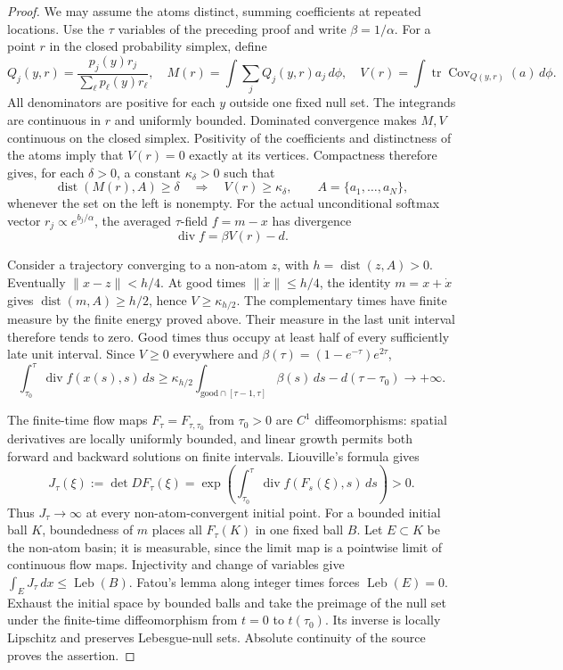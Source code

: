 \documentclass[11pt]{article}
\newcommand{\Cov}{\operatorname{Cov}}
\newcommand{\dist}{\operatorname{dist}}
\begin{document}
\begin{proof}
We may assume the atoms distinct, summing coefficients at repeated locations.
Use the $\tau$ variables of the preceding proof and write $\beta=1/\alpha$.
For a point $r$ in the closed probability simplex, define
\[
Q_j(y,r)=\frac{p_j(y)r_j}{\sum_\ell p_\ell(y)r_\ell},\quad
M(r)=\int\sum_jQ_j(y,r)a_j\,d\phi,\quad
V(r)=\int\operatorname{tr}\Cov_{Q(y,r)}(a)\,d\phi.
\]
All denominators are positive for each $y$ outside one fixed null set.
The integrands are continuous in $r$ and uniformly bounded. Dominated
convergence makes $M,V$ continuous on the closed simplex. Positivity of the
coefficients and distinctness of the atoms imply that $V(r)=0$ exactly at its
vertices. Compactness therefore gives, for each $\delta>0$, a constant
$\kappa_\delta>0$ such that
\[
\dist(M(r),A)\ge\delta\quad\Longrightarrow\quad V(r)\ge\kappa_\delta,
\qquad A=\{a_1,\ldots,a_N\},
\]
whenever the set on the left is nonempty.
For the actual unconditional softmax vector $r_j\propto e^{b_j/\alpha}$,
the averaged $\tau$-field $f=m-x$ has divergence
\[
\operatorname{div}f=\beta V(r)-d.
\]

Consider a trajectory converging to a non-atom $z$, with $h=\dist(z,A)>0$.
Eventually $\lVert x-z\rVert<h/4$. At good times
$\lVert\dot x\rVert\le h/4$, the identity $m=x+\dot x$ gives
$\dist(m,A)\ge h/2$, hence $V\ge\kappa_{h/2}$.
The complementary times have finite measure by the finite energy proved above.
Their measure in the last unit interval therefore tends to zero. Good times
thus occupy at least half of every sufficiently late unit interval. Since
$V\ge0$ everywhere and $\beta(\tau)=(1-e^{-\tau})e^{2\tau}$,
\[
\int_{\tau_0}^\tau\operatorname{div}f(x(s),s)\,ds
\ge\kappa_{h/2}\int_{\mathrm{good}\cap[\tau-1,\tau]}\beta(s)\,ds
-d(\tau-\tau_0)\longrightarrow+\infty.
\]

The finite-time flow maps $F_\tau=F_{\tau,\tau_0}$ from $\tau_0>0$ are $C^1$
diffeomorphisms: spatial derivatives are locally uniformly bounded, and linear
growth permits both forward and backward solutions on finite intervals.
Liouville's formula gives
\[
J_\tau(\xi):=\det DF_\tau(\xi)
=\exp\!\left(\int_{\tau_0}^\tau
\operatorname{div}f(F_s(\xi),s)\,ds\right)>0.
\]
Thus $J_\tau\to\infty$ at every non-atom-convergent initial point.
For a bounded initial ball $K$, boundedness of $m$ places all $F_\tau(K)$
in one fixed ball $B$. Let $E\subset K$ be the non-atom basin; it is measurable,
since the limit map is a pointwise limit of continuous flow maps. Injectivity
and change of variables give $\int_EJ_\tau\,dx\le\operatorname{Leb}(B)$.
Fatou's lemma along integer times forces $\operatorname{Leb}(E)=0$.
Exhaust the initial space by bounded balls and take the preimage of the null
set under the finite-time diffeomorphism from $t=0$ to $t(\tau_0)$. Its inverse
is locally Lipschitz and preserves Lebesgue-null sets. Absolute continuity
of the source proves the assertion.
\end{proof}
\end{document}
